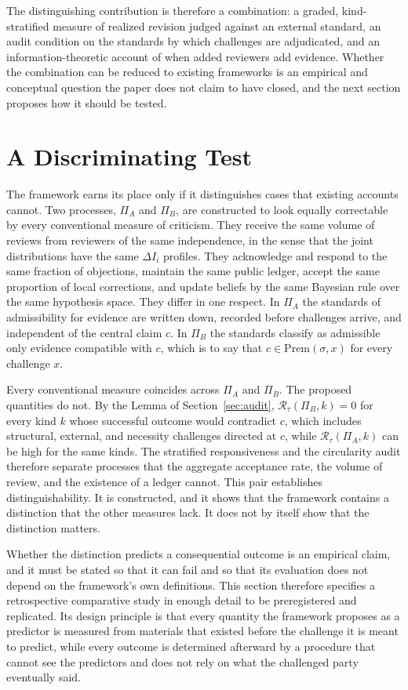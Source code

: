 \documentclass[11pt]{article}
\theoremstyle{remark}
\begin{document}
The distinguishing contribution is therefore a combination: a graded, kind-stratified measure of realized revision judged against an external standard, an audit condition on the standards by which challenges are adjudicated, and an information-theoretic account of when added reviewers add evidence. Whether the combination can be reduced to existing frameworks is an empirical and conceptual question the paper does not claim to have closed, and the next section proposes how it should be tested.

\section{A Discriminating Test}
\label{sec:discriminating}

The framework earns its place only if it distinguishes cases that existing accounts cannot. Two processes, $\Pi_A$ and $\Pi_B$, are constructed to look equally correctable by every conventional measure of criticism. They receive the same volume of reviews from reviewers of the same independence, in the sense that the joint distributions have the same $\Delta I_i$ profiles. They acknowledge and respond to the same fraction of objections, maintain the same public ledger, accept the same proportion of local corrections, and update beliefs by the same Bayesian rule over the same hypothesis space. They differ in one respect. In $\Pi_A$ the standards of admissibility for evidence are written down, recorded before challenges arrive, and independent of the central claim $c$. In $\Pi_B$ the standards classify as admissible only evidence compatible with $c$, which is to say that $c\in\mathrm{Prem}(\sigma,x)$ for every challenge $x$.

Every conventional measure coincides across $\Pi_A$ and $\Pi_B$. The proposed quantities do not. By the Lemma of Section~\ref{sec:audit}, $\mathcal R_\tau(\Pi_B,k)=0$ for every kind $k$ whose successful outcome would contradict $c$, which includes structural, external, and necessity challenges directed at $c$, while $\mathcal R_\tau(\Pi_A,k)$ can be high for the same kinds. The stratified responsiveness and the circularity audit therefore separate processes that the aggregate acceptance rate, the volume of review, and the existence of a ledger cannot. This pair establishes distinguishability. It is constructed, and it shows that the framework contains a distinction that the other measures lack. It does not by itself show that the distinction matters.

Whether the distinction predicts a consequential outcome is an empirical claim, and it must be stated so that it can fail and so that its evaluation does not depend on the framework's own definitions. This section therefore specifies a retrospective comparative study in enough detail to be preregistered and replicated. Its design principle is that every quantity the framework proposes as a predictor is measured from materials that existed before the challenge it is meant to predict, while every outcome is determined afterward by a procedure that cannot see the predictors and does not rely on what the challenged party eventually said.
\end{document}
